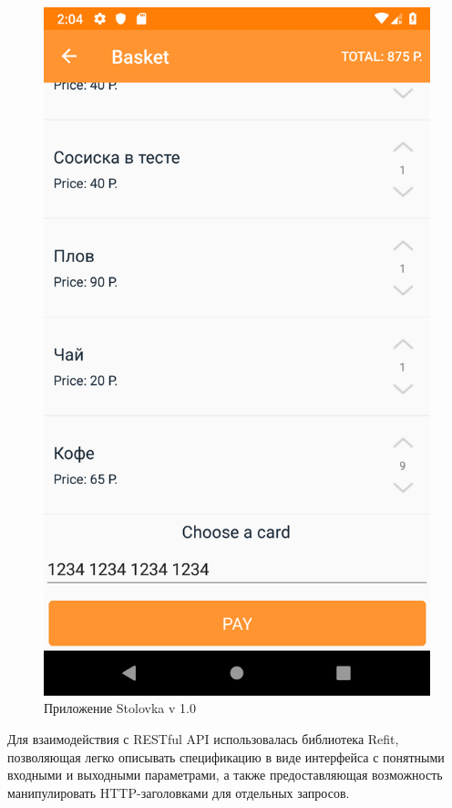 \documentclass[14pt]{matmex-diploma-custom}
\begin{document}
\begin{figure}[h!]
{\begin{minipage}[t]{0.3\textwidth}
	                \includegraphics[width=\textwidth]{images/stolovka_screen_03}
	            \end{minipage}}
	        \caption{Приложение Stolovka v 1.0}
	        \label{fig:stolovka_ui}
	    \end{figure}

	    Для взаимодействия с RESTful API использовалась библиотека Refit, позволяющая легко описывать спецификацию в виде интерфейса с понятными входными и выходными параметрами, а также предоставляющая возможность манипулировать HTTP-заголовками для отдельных запросов.
\end{document}

